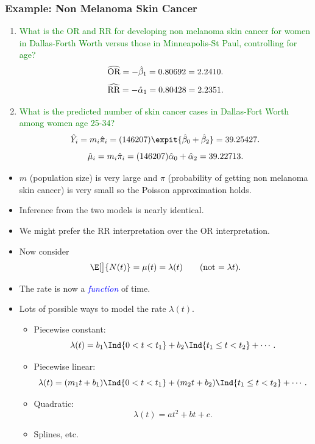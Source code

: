 \documentclass[oneside]{book}\usepackage[]{graphicx}\usepackage[svgnames]{xcolor}
\let\exp\relax%
\newcommand{\OR}{\text{OR}}%
\newcommand{\RR}{\text{RR}}%
\begin{document}
\subsubsection*{Example: Non Melanoma Skin Cancer}
\begin{enumerate}[1.]
    \item \textcolor{Green}{What is the OR and RR for developing non melanoma skin cancer for women in
              Dallas-Forth Worth versus those in Minneapolis-St Paul, controlling for age?}
          \[ \widehat{\OR}=\exp{-\hat{\beta}_1}=\exp{0.80692}=2.2410. \]
          \[ \widehat{\RR}=\exp{-\hat{\alpha}_1}=\exp{0.80428}=2.2351. \]
    \item \textcolor{Green}{What is the predicted number of skin cancer cases in Dallas-Fort Worth among
              women age 25-34?}
          \[ \hat{Y}_i=m_i\hat{\pi}_i=(146207)\expit{\hat{\beta}_0+\hat{\beta}_2}=39.25427. \]
          \[ \hat{\mu}_i=m_i\hat{\pi}_i=(146207)\exp{\hat{\alpha}_0+\hat{\alpha}_2}=39.22713. \]
\end{enumerate}
\begin{itemize}
    \item $m$ (population size) is very large and $ \pi $ (probability of getting non melanoma skin
          cancer) is very small so the Poisson approximation holds.
    \item Inference from the two models is nearly identical.
    \item We might prefer the RR interpretation over the OR interpretation.
\end{itemize}
\begin{itemize}
    \item Now consider
          \[ \E[\big]{N(t)}=\mu(t)=\lambda(t)\qquad\text{(not $=\lambda t$)}. \]
    \item The rate is now a \emph{\textcolor{Blue}{function}} of time.
    \item Lots of possible ways to model the rate $ \lambda(t) $.
          \begin{itemize}
              \item Piecewise constant:
                    \[ \lambda(t)=b_1\Ind{0<t<t_1}+b_2\Ind{t_1\le t<t_2}+\cdots. \]
              \item Piecewise linear:
                    \[ \lambda(t)=(m_1 t+b_1)\Ind{0<t<t_1}+(m_2 t+b_2)\Ind{t_1\le t<t_2}+\cdots. \]
              \item Quadratic:
                    \[ \lambda(t)=at^2+bt+c. \]
              \item Splines, etc.
          \end{itemize}
\end{itemize}
\end{document}
